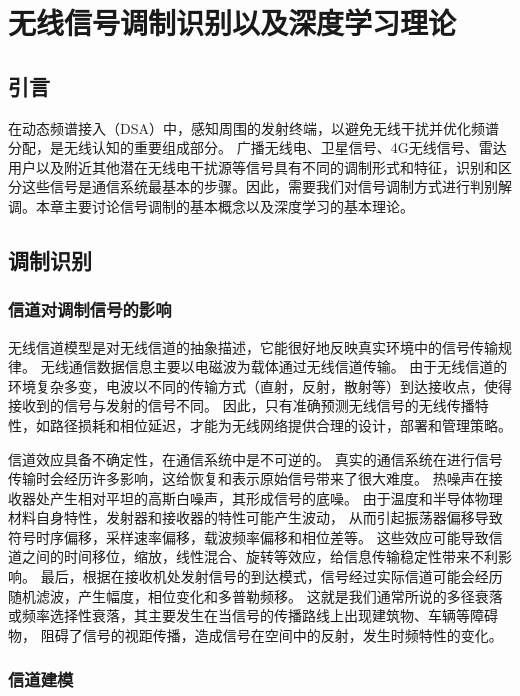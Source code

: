 
\chapter{无线信号调制识别以及深度学习理论}
\label{chap: mod_rec_deep_learning_theo}
\section{引言}
在动态频谱接入（DSA）中，感知周围的发射终端，以避免无线干扰并优化频谱分配，是无线认知的重要组成部分。 广播无线电、卫星信号、4G无线信号、雷达用户以及附近其他潜在无线电干扰源等信号具有不同的调制形式和特征，识别和区分这些信号是通信系统最基本的步骤。因此，需要我们对信号调制方式进行判别解调。本章主要讨论信号调制的基本概念以及深度学习的基本理论。

\section{调制识别}

\subsection{信道对调制信号的影响}
无线信道模型是对无线信道的抽象描述，它能很好地反映真实环境中的信号传输规律。
无线通信数据信息主要以电磁波为载体通过无线信道传输。 
由于无线信道的环境复杂多变，电波以不同的传输方式（直射，反射，散射等）到达接收点，使得接收到的信号与发射的信号不同。
因此，只有准确预测无线信号的无线传播特性，如路径损耗和相位延迟，才能为无线网络提供合理的设计，部署和管理策略。\par

信道效应具备不确定性，在通信系统中是不可逆的。
真实的通信系统在进行信号传输时会经历许多影响，这给恢复和表示原始信号带来了很大难度。
热噪声在接收器处产生相对平坦的高斯白噪声，其形成信号的底噪。
由于温度和半导体物理材料自身特性，发射器和接收器的特性可能产生波动，
从而引起振荡器偏移导致符号时序偏移，采样速率偏移，载波频率偏移和相位差等。
这些效应可能导致信道之间的时间移位，缩放，线性混合、旋转等效应，给信息传输稳定性带来不利影响。
最后，根据在接收机处发射信号的到达模式，信号经过实际信道可能会经历随机滤波，产生幅度，相位变化和多普勒频移。
这就是我们通常所说的多径衰落或频率选择性衰落，其主要发生在当信号的传播路线上出现建筑物、车辆等障碍物，
阻碍了信号的视距传播，造成信号在空间中的反射，发生时频特性的变化。\par

\subsection{信道建模}

